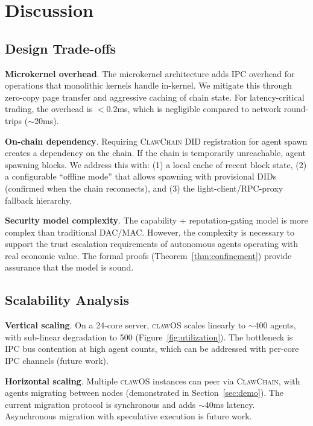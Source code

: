 \documentclass{article}
\newcommand{\clawos}{\textsc{clawOS}}
\newcommand{\clawchain}{\textsc{ClawChain}}
\begin{document}
%
%

\section{Discussion}
\label{sec:discussion}

\subsection{Design Trade-offs}

\textbf{Microkernel overhead}. The microkernel architecture adds IPC overhead for operations that monolithic kernels handle in-kernel. We mitigate this through zero-copy page transfer and aggressive caching of chain state. For latency-critical trading, the overhead is $<$0.2ms, which is negligible compared to network round-trips ($\sim$20ms).

\textbf{On-chain dependency}. Requiring \clawchain{} DID registration for agent spawn creates a dependency on the chain. If the chain is temporarily unreachable, agent spawning blocks. We address this with: (1) a local cache of recent block state, (2) a configurable ``offline mode'' that allows spawning with provisional DIDs (confirmed when the chain reconnects), and (3) the light-client/RPC-proxy fallback hierarchy.

\textbf{Security model complexity}. The capability + reputation-gating model is more complex than traditional DAC/MAC. However, the complexity is necessary to support the trust escalation requirements of autonomous agents operating with real economic value. The formal proofs (Theorem~\ref{thm:confinement}) provide assurance that the model is sound.

\subsection{Scalability Analysis}

\textbf{Vertical scaling}. On a 24-core server, \clawos{} scales linearly to $\sim$400 agents, with sub-linear degradation to 500 (Figure~\ref{fig:utilization}). The bottleneck is IPC bus contention at high agent counts, which can be addressed with per-core IPC channels (future work).

\textbf{Horizontal scaling}. Multiple \clawos{} instances can peer via \clawchain{}, with agents migrating between nodes (demonstrated in Section~\ref{sec:demo}). The current migration protocol is synchronous and adds $\sim$40ms latency. Asynchronous migration with speculative execution is future work.
\end{document}
